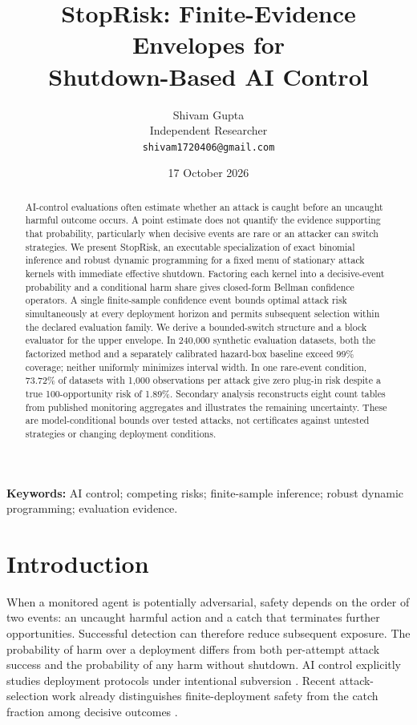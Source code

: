 \documentclass[10pt]{article}
\title{\vspace{-8mm}\textbf{StopRisk: Finite-Evidence Envelopes for\\ Shutdown-Based AI Control}}
\author{Shivam Gupta\\Independent Researcher\\\texttt{shivam1720406@gmail.com}}
\date{17 October 2026}
\begin{document}
\maketitle
\begin{abstract}
AI-control evaluations often estimate whether an attack is caught before an uncaught harmful outcome occurs. A point estimate does not quantify the evidence supporting that probability, particularly when decisive events are rare or an attacker can switch strategies. We present StopRisk, an executable specialization of exact binomial inference and robust dynamic programming for a fixed menu of stationary attack kernels with immediate effective shutdown. Factoring each kernel into a decisive-event probability and a conditional harm share gives closed-form Bellman confidence operators. A single finite-sample confidence event bounds optimal attack risk simultaneously at every deployment horizon and permits subsequent selection within the declared evaluation family. We derive a bounded-switch structure and a block evaluator for the upper envelope. In 240,000 synthetic evaluation datasets, both the factorized method and a separately calibrated hazard-box baseline exceed 99\% coverage; neither uniformly minimizes interval width. In one rare-event condition, 73.72\% of datasets with 1,000 observations per attack give zero plug-in risk despite a true 100-opportunity risk of 1.89\%. Secondary analysis reconstructs eight count tables from published monitoring aggregates and illustrates the remaining uncertainty. These are model-conditional bounds over tested attacks, not certificates against untested strategies or changing deployment conditions.
\end{abstract}
\noindent\textbf{Keywords:} AI control; competing risks; finite-sample inference; robust dynamic programming; evaluation evidence.

\section{Introduction}
When a monitored agent is potentially adversarial, safety depends on the order of two events: an uncaught harmful action and a catch that terminates further opportunities. Successful detection can therefore reduce subsequent exposure. The probability of harm over a deployment differs from both per-attempt attack success and the probability of any harm without shutdown. AI control explicitly studies deployment protocols under intentional subversion \citep{greenblatt,griffin}. Recent attack-selection work already distinguishes finite-deployment safety from the catch fraction among decisive outcomes \citep{gewang}.
\end{document}
